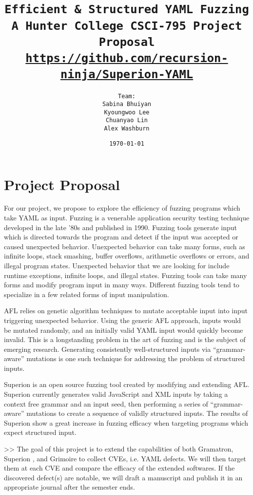 \documentclass[12pt]{diazessay}
\title{\texttt{\huge{Efficient \& Structured YAML Fuzzing} \\\vspace{-0.65cm} {\large A Hunter College CSCI-795 Project Proposal}\\\normalsize\url{https://github.com/recursion-ninja/Superion-YAML}}} %
\author{\texttt{{\Huge Team:}\\\vspace*{-0.5em} 
		Sabina Bhuiyan \\\vspace*{-0.5em} 
		Kyoungwoo Lee \\\vspace*{-0.5em}
		Chuanyao Lin \\\vspace*{-0.25em}
		Alex Washburn}} %
\date{\texttt{\today}} %
\begin{document}
\maketitle %

\vspace{-2cm}
\section*{Project Proposal}

For our project, we propose to explore the efficiency of fuzzing programs which take YAML\cite{YAMLdraft} as input.
Fuzzing is a venerable application security testing technique developed in the late '80s\cite{Barton1988} and published in 1990\cite{Miller1990}.
Fuzzing tools generate input which is directed towards the program and detect if the input was accepted or caused unexpected behavior.
Unexpected behavior can take many forms, such as infinite loops, stack smashing, buffer overflows, arithmetic overflows or errors, and illegal program states.
Unexpected behavior that we are looking for include runtime exceptions, infinite loops, and illegal states.
Fuzzing tools can take many forms\cite{ModelBasedFuzzing}\cite{GrammarBasedFuzzing}\cite{ProtocolBasedFuzzing} and modify program input in many ways.
Different fuzzing tools tend to specialize in a few related forms of input\cite{InputDiversity} manipulation.

AFL\cite{AFL_page} relies on genetic algorithm techniques\cite{InputMutationAlgorithm} to mutate acceptable input into input triggering unexpected behavior. Using the generic AFL approach, inputs would be mutated randomly, and an initially valid YAML input would quickly become invalid.
This is a longstanding problem in the art of fuzzing and is the subject of emerging research.
Generating consistently well-structured inputs\cite{structuredInput} via ``grammar-aware'' mutations is one such technique for addressing the problem of structured inputs.

Superion\cite{superion} is an open source fuzzing tool created by modifying and extending AFL.
Superion currently generates valid JavaScript and XML inputs by taking a context free grammar and an input seed, then performing a series of ``grammar-aware'' mutations to create a sequence of validly structured inputs.
The results of Superion show a great increase in fuzzing efficacy when targeting programs which expect structured input. 

>> The goal of this project is to extend the capabilities of both Gramatron, Superion , and Grimoire to collect CVEs, i.e. YAML defects. 
We will then target them at each CVE and compare the efficacy of the extended softwares.
If the discovered defect(s) are notable, we will draft a manuscript and publish it in an appropriate journal after the semester ends.
\end{document}

